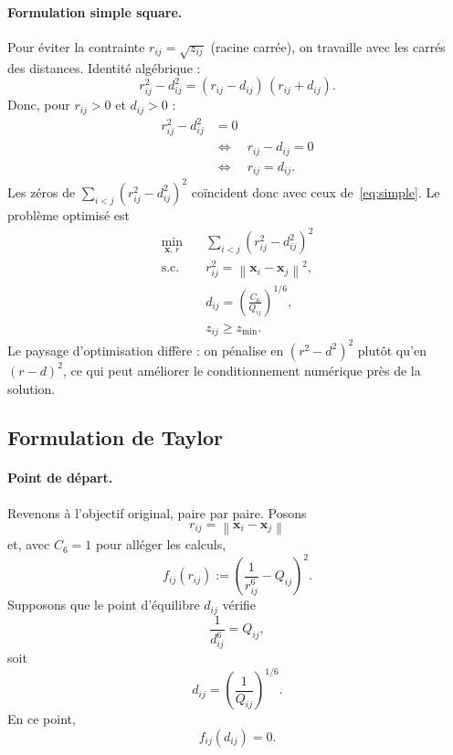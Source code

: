 \documentclass[11pt,a4paper]{article}
\theoremstyle{definition}
\theoremstyle{remark}
\newcommand{\norm}[1]{\left\|#1\right\|}
\newcommand{\cSix}{C_6}
\begin{document}
\paragraph{Formulation simple square.}
Pour éviter la contrainte $r_{ij}=\sqrt{z_{ij}}$ (racine carrée),
on travaille avec les carrés des distances. Identité algébrique :
\begin{equation}
  r_{ij}^2 - d_{ij}^2
  =
  (r_{ij}-d_{ij})\,(r_{ij}+d_{ij}).
\end{equation}
Donc, pour $r_{ij}>0$ et $d_{ij}>0$ :
\begin{align}
  r_{ij}^2 - d_{ij}^2
  &=
  0
  \\
  &\Longleftrightarrow
  \quad
  r_{ij}-d_{ij}
  =
  0
  \\
  &\Longleftrightarrow
  \quad
  r_{ij}
  =
  d_{ij}.
\end{align}
Les zéros de $\sum_{i<j}(r_{ij}^2-d_{ij}^2)^2$ coïncident donc avec
ceux de~\eqref{eq:simple}. Le problème optimisé est
\begin{equation}
  \boxed{
  \begin{aligned}
    \min_{\mathbf{x},\,r}
    &\quad
    \sum_{i<j}
    (r_{ij}^2-d_{ij}^2)^2
    \\
    \text{s.c.}
    &\quad
    r_{ij}^2
    =
    \norm{\mathbf{x}_i-\mathbf{x}_j}^2,
    \\
    &\quad
    d_{ij}
    =
    \left(
      \frac{\cSix}{Q_{ij}}
    \right)^{1/6},
    \\
    &\quad
    z_{ij}
    \geq
    z_{\min}.
  \end{aligned}
  }
  \label{eq:simple-square}
\end{equation}
Le paysage d'optimisation diffère : on pénalise en $(r^2-d^2)^2$
plutôt qu'en $(r-d)^2$, ce qui peut améliorer le conditionnement
numérique près de la solution.

\subsection{Formulation de Taylor}
\label{sec:form-taylor}

\paragraph{Point de départ.}
Revenons à l'objectif original, paire par paire. Posons
\begin{equation}
  r_{ij}
  =
  \norm{\mathbf{x}_i-\mathbf{x}_j}
\end{equation}
et, avec $\cSix=1$ pour alléger les calculs,
\begin{equation}
  f_{ij}(r_{ij})
  :=
  \left(
    \frac{1}{r_{ij}^6}
    - Q_{ij}
  \right)^2.
  \label{eq:fij}
\end{equation}
Supposons que le point d'équilibre $d_{ij}$ vérifie
\begin{equation}
  \frac{1}{d_{ij}^6}
  =
  Q_{ij},
\end{equation}
soit
\begin{equation}
  d_{ij}
  =
  \left(
    \frac{1}{Q_{ij}}
  \right)^{1/6}.
\end{equation}
En ce point,
\begin{equation}
  f_{ij}(d_{ij})
  =
  0.
\end{equation}
\end{document}
